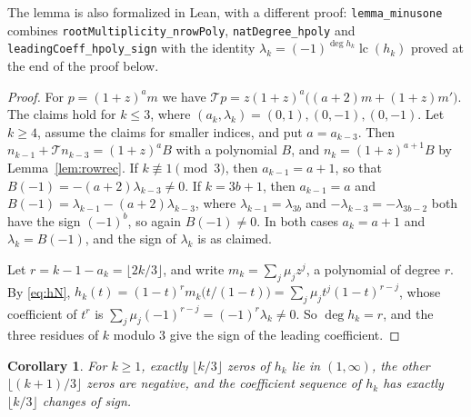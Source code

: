 \documentclass[11pt]{amsart}
\newtheorem{corollary}[theorem]{Corollary}
\theoremstyle{definition}
\newcommand{\lean}[1]{\texttt{#1}}
\DeclareMathOperator{\lc}{lc}
\begin{document}
\begin{sloppypar}
The lemma is also formalized in Lean, with a different proof: \lean{lemma\_minusone} combines \lean{rootMultiplicity\_nrowPoly}, \lean{natDegree\_hpoly} and \lean{leadingCoeff\_hpoly\_sign} with the identity $\lambda_k=(-1)^{\deg h_k}\lc(h_k)$ proved at the end of the proof below.
\end{sloppypar}

\begin{proof}
For $p=(1+z)^am$ we have $\mathcal Tp=z(1+z)^a\bigl((a+2)m+(1+z)m'\bigr)$. The claims hold for $k\le3$, where $(a_k,\lambda_k)=(0,1),(0,-1),(0,-1)$. Let $k\ge4$, assume the claims for smaller indices, and put $a=a_{k-3}$. Then $n_{k-1}+\mathcal Tn_{k-3}=(1+z)^aB$ with a polynomial $B$, and $n_k=(1+z)^{a+1}B$ by Lemma~\ref{lem:rowrec}. If $k\not\equiv1\pmod3$, then $a_{k-1}=a+1$, so that $B(-1)=-(a+2)\lambda_{k-3}\ne0$. If $k=3b+1$, then $a_{k-1}=a$ and $B(-1)=\lambda_{k-1}-(a+2)\lambda_{k-3}$, where $\lambda_{k-1}=\lambda_{3b}$ and $-\lambda_{k-3}=-\lambda_{3b-2}$ both have the sign $(-1)^b$, so again $B(-1)\ne0$. In both cases $a_k=a+1$ and $\lambda_k=B(-1)$, and the sign of $\lambda_k$ is as claimed.

Let $r=k-1-a_k=\lfloor2k/3\rfloor$, and write $m_k=\sum_j\mu_jz^j$, a polynomial of degree $r$. By \eqref{eq:hN}, $h_k(t)=(1-t)^{r}m_k\bigl(t/(1-t)\bigr)=\sum_j\mu_jt^j(1-t)^{r-j}$, whose coefficient of $t^r$ is $\sum_j\mu_j(-1)^{r-j}=(-1)^r\lambda_k\ne0$. So $\deg h_k=r$, and the three residues of $k$ modulo $3$ give the sign of the leading coefficient.
\end{proof}

\begin{corollary}\label{cor:hk-signs}
For $k\ge1$, exactly $\lfloor k/3\rfloor$ zeros of $h_k$ lie in $(1,\infty)$, the other $\lfloor(k+1)/3\rfloor$ zeros are negative, and the coefficient sequence of $h_k$ has exactly $\lfloor k/3\rfloor$ changes of sign.
\end{corollary}
\end{document}
